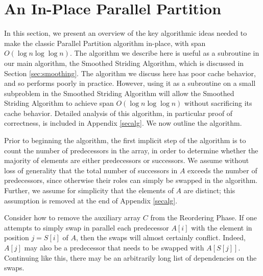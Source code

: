 \documentclass[twoside,leqno,twocolumn]{article}
\renewcommand{\paragraph}[1]{\vspace{0.09in}\noindent{\bf \boldmath #1.}}
\begin{document}
\section{An In-Place Parallel Partition}
\label{sec:blockedprefixsumpartitionalg}
In this section, we present an overview of the key algorithmic ideas needed to
make the classic Parallel Partition algorithm in-place, with span $O(\log n \log\log n)$.
The algorithm we describe here is useful as a subroutine in our main algorithm,
the Smoothed Striding Algorithm, which is discussed in Section
\ref{sec:smoothing}.
The algorithm we discuss here has poor cache behavior, and so performs poorly
in practice. However, using it as a subroutine on a small subproblem in the
Smoothed Striding Algorithm will allow the Smoothed Striding Algorithm to achieve span $O(\log n \log\log n)$
without sacrificing its cache behavior. 
Detailed analysis of this algorithm, in particular proof of correctness, is
included in Appendix \ref{secalg}.
We now outline the algorithm. 

\paragraph{Algorithm Outline}
Prior to beginning the algorithm, the first implicit step of the
algorithm is to count the number of predecessors in the array, in
order to determine whether the majority of elements are either
predecessors or successors. We assume without loss of generality that the total
number of successors in $A$ exceeds the number of predecessors, since otherwise
their roles can simply be swapped in the algorithm. Further, we assume for
simplicity that the elements of $A$ are distinct; this assumption is removed at
the end of Appendix \ref{secalg}.

Consider how to remove the auxiliary array $C$ from the Reordering
Phase. If one attempts to simply swap in parallel each predecessor
$A[i]$ with the element in position $j = S[i]$ of $A$, then the swaps
will almost certainly conflict. Indeed, $A[j]$ may also be a
predecessor that needs to be swapped with $A[S[j]]$. Continuing like
this, there may be an arbitrarily long list of dependencies on the
swaps.
\end{document}
